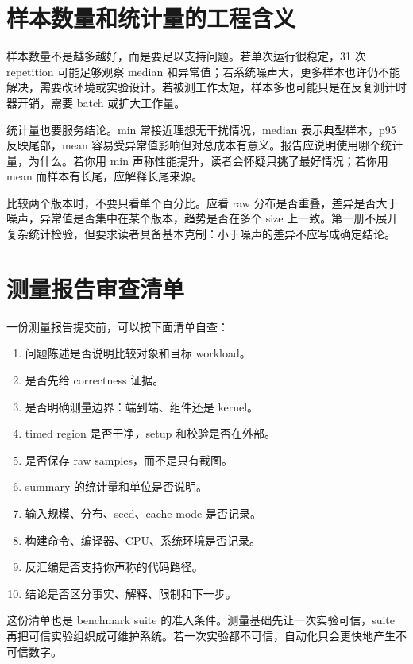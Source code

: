 \section{样本数量和统计量的工程含义}

样本数量不是越多越好，而是要足以支持问题。若单次运行很稳定，31 次 repetition 可能足够观察 median 和异常值；若系统噪声大，更多样本也许仍不能解决，需要改环境或实验设计。若被测工作太短，样本多也可能只是在反复测计时器开销，需要 batch 或扩大工作量。

统计量也要服务结论。min 常接近理想无干扰情况，median 表示典型样本，p95 反映尾部，mean 容易受异常值影响但对总成本有意义。报告应说明使用哪个统计量，为什么。若你用 min 声称性能提升，读者会怀疑只挑了最好情况；若你用 mean 而样本有长尾，应解释长尾来源。

比较两个版本时，不要只看单个百分比。应看 raw 分布是否重叠，差异是否大于噪声，异常值是否集中在某个版本，趋势是否在多个 size 上一致。第一册不展开复杂统计检验，但要求读者具备基本克制：小于噪声的差异不应写成确定结论。

\section{测量报告审查清单}

一份测量报告提交前，可以按下面清单自查：

\begin{enumerate}
  \item 问题陈述是否说明比较对象和目标 workload。
  \item 是否先给 correctness 证据。
  \item 是否明确测量边界：端到端、组件还是 kernel。
  \item timed region 是否干净，setup 和校验是否在外部。
  \item 是否保存 raw samples，而不是只有截图。
  \item summary 的统计量和单位是否说明。
  \item 输入规模、分布、seed、cache mode 是否记录。
  \item 构建命令、编译器、CPU、系统环境是否记录。
  \item 反汇编是否支持你声称的代码路径。
  \item 结论是否区分事实、解释、限制和下一步。
\end{enumerate}

这份清单也是 benchmark suite 的准入条件。测量基础先让一次实验可信，suite 再把可信实验组织成可维护系统。若一次实验都不可信，自动化只会更快地产生不可信数字。

